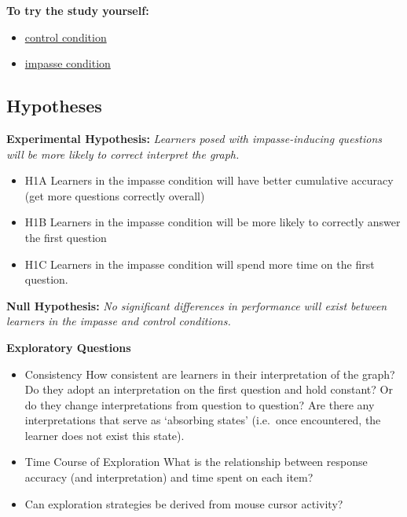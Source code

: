 \documentclass[
  letterpaper,
  DIV=11,
  numbers=noendperiod]{scrreprt}
\providecommand{\tightlist}{%
  \setlength{\itemsep}{0pt}\setlength{\parskip}{0pt}}\usepackage{longtable,booktabs,array}
\begin{document}
\textbf{To try the study yourself:}

\begin{itemize}
\tightlist
\item
  \href{https://limitless-plains-85018.herokuapp.com/?study=SGC3A\&condition=111\&session=WEB-DEMO}{control
  condition}
\item
  \href{https://limitless-plains-85018.herokuapp.com/?study=SGC3A\&condition=121\&session=WEB-DEMO}{impasse
  condition}
\end{itemize}

\hypertarget{hypotheses}{%
\subsection{Hypotheses}\label{hypotheses}}

\textbf{Experimental Hypothesis:} \emph{Learners posed with
impasse-inducing questions will be more likely to correct interpret the
graph.}

\begin{itemize}
\tightlist
\item
  H1A \textbar{} Learners in the impasse condition will have better
  cumulative accuracy (get more questions correctly overall)
\item
  H1B \textbar{} Learners in the impasse condition will be more likely
  to correctly answer the first question
\item
  H1C \textbar{} Learners in the impasse condition will spend more time
  on the first question.
\end{itemize}

\textbf{Null Hypothesis:} \emph{No significant differences in
performance will exist between learners in the impasse and control
conditions.}

\textbf{Exploratory Questions}

\begin{itemize}
\tightlist
\item
  Consistency \textbar{} How consistent are learners in their
  interpretation of the graph? Do they adopt an interpretation on the
  first question and hold constant? Or do they change interpretations
  from question to question? Are there any interpretations that serve as
  `absorbing states' (i.e.~once encountered, the learner does not exist
  this state).
\item
  Time Course of Exploration \textbar{} What is the relationship between
  response accuracy (and interpretation) and time spent on each item?
\item
  Can exploration strategies be derived from mouse cursor activity?
\end{itemize}
\end{document}
